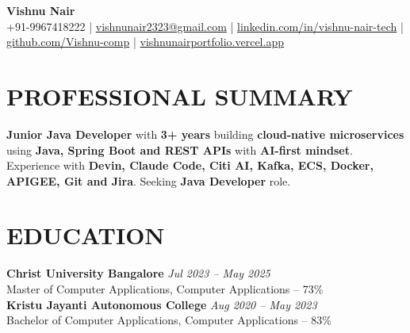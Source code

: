 \documentclass[10pt,a4paper]{article}
\begin{document}

\begin{center}

{\Large \textbf{Vishnu Nair}}\\[4pt]

{\small
+91-9967418222
\quad|\quad
\href{mailto:vishnunair2323@gmail.com}{vishnunair2323@gmail.com}
\quad|\quad
\href{https://linkedin.com/in/vishnu-nair-tech}{linkedin.com/in/vishnu-nair-tech}
\quad|\quad
\href{https://github.com/Vishnu-comp}{github.com/Vishnu-comp}
\quad|\quad
\href{https://vishnunairportfolio.vercel.app}{vishnunairportfolio.vercel.app}
}

\end{center}


\section*{PROFESSIONAL SUMMARY}

\small

\textbf{Junior Java Developer} with \textbf{3+ years} building \textbf{cloud-native microservices} using \textbf{Java, Spring Boot and REST APIs} with \textbf{AI-first mindset}. Experience with \textbf{Devin, Claude Code, Citi AI, Kafka, ECS, Docker, APIGEE, Git and Jira}. Seeking \textbf{Java Developer} role.


\section*{EDUCATION}
\small
\textbf{Christ University Bangalore} \hfill \textit{Jul 2023 -- May 2025}\\
Master of Computer Applications, Computer Applications -- 73\%\\
\small
\textbf{Kristu Jayanti Autonomous College} \hfill \textit{Aug 2020 -- May 2023}\\
Bachelor of Computer Applications, Computer Applications -- 83\%

\end{document}
